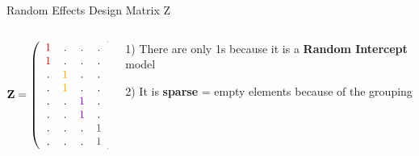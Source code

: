 \documentclass{beamer}
\begin{document}
\begin{frame}{Random Effects Design Matrix Z}
\begin{columns}
        \begin{column}{0.5\textwidth}
\[
\mathbf{Z} = \left( 
\begin{array}{cccc} 
\color{darkred}{1} & . & . & . \\ 
\color{darkred}{1} & . & . & . \\ 
. & \color{orange}{1} & . & . \\ 
. & \color{orange}{1} & . & . \\ 
. & . & \color{violet}{1} & . \\ 
. & . & \color{violet}{1} & . \\ 
. & . & . & \color{darkgray}{1} \\ 
. & . & . & \color{darkgray}{1} 
\end{array}\right)
\]
        \end{column}
        \begin{column}{0.5\textwidth}
        \large
            1) There are only 1s because it is a \textbf{Random Intercept} model \\
            \vspace{0.3cm}
            
            2) It is \textbf{sparse} = empty elements because of the grouping
        \end{column}
    \end{columns}

\end{frame}
\end{document}
